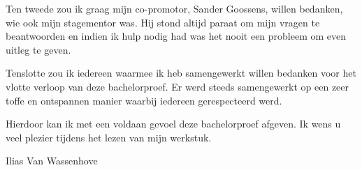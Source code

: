 Ten tweede zou ik graag mijn co-promotor, Sander Goossens, willen bedanken, wie ook mijn stagementor was. Hij stond altijd paraat om mijn vragen te beantwoorden en indien ik hulp nodig had was het nooit een probleem om even uitleg te geven.

Tenslotte zou ik iedereen waarmee ik heb samengewerkt willen bedanken voor het vlotte verloop van deze bachelorproef. Er werd steeds samengewerkt op een zeer toffe en ontspannen manier waarbij iedereen gerespecteerd werd.

Hierdoor kan ik met een voldaan gevoel deze bachelorproef afgeven. Ik wens u veel plezier tijdens het lezen van mijn werkstuk.

Ilias Van Wassenhove



